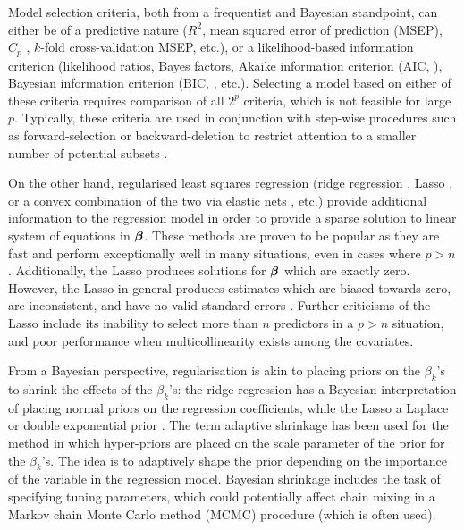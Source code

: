 \documentclass[showframe,11pt,twoside,openright]{report}
\begin{document}
Model selection criteria, both from a frequentist and Bayesian standpoint, can either be of a predictive nature ($R^2$, mean squared error of prediction (MSEP), $C_p$ \citep{mallows1973some}, $k$-fold cross-validation MSEP, etc.), or a likelihood-based information criterion (likelihood ratios, Bayes factors, Akaike information criterion (AIC, \cite{akaike1973}), Bayesian information criterion (BIC, \cite{schwarz1978estimating}, etc.).
Selecting a model based on either of these criteria requires comparison of all $2^p$ criteria, which is not feasible for large $p$.
Typically, these criteria are used in conjunction with step-wise procedures such as forward-selection or backward-deletion to restrict attention to a smaller number of potential subsets \citep{George1993,miller2002subset}.

On the other hand, regularised least squares regression (ridge regression \citep{hoerl1970ridge}, Lasso \citep{tibshirani1996regression}, or a convex combination of the two via elastic nets \citep{zou2005regularization}, etc.) provide additional information to the regression model in order to provide a sparse solution to linear system of equations in ${\bm\beta}$.
These methods are proven to be popular as they are fast and perform exceptionally well in many situations, even in cases where $p > n$.
Additionally, the Lasso produces solutions for ${\bm\beta}$ which are exactly zero.
However, the Lasso in general produces estimates which are biased towards zero, are inconsistent, and have no valid standard errors \citep{friedman2001elements,kyung2010penalized}.
Further criticisms of the Lasso include its inability to select more than $n$ predictors in a $p>n$ situation, and poor performance when multicollinearity exists among the covariates.

From a Bayesian perspective, regularisation is akin to placing priors on the $\beta_k$'s to shrink the effects of the $\beta_k$'s: the ridge regression has a Bayesian interpretation of placing normal priors on the regression coefficients, while the Lasso a Laplace or double exponential prior \citep{park2008bayesian}.
The term adaptive shrinkage has been used for the method in which hyper-priors are placed on the scale parameter of the prior for the $\beta_k$'s.
The idea is to adaptively shape the prior depending on the importance of the variable in the regression model.
Bayesian shrinkage includes the task of specifying tuning parameters, which could potentially affect chain mixing in a Markov chain Monte Carlo method (MCMC) procedure (which is often used).
\end{document}
